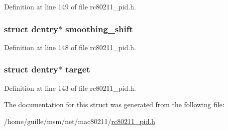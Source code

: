 Definition at line 149 of file rc80211\-\_\-pid.\-h.

\hypertarget{structrc__pid__debugfs__entries_aaca47ee03a834e073bbf46987f4a531b}{
\subsubsection[{smoothing\-\_\-shift}]{\setlength{\rightskip}{0pt plus 5cm}struct dentry$\ast$ smoothing\-\_\-shift}}\label{structrc__pid__debugfs__entries_aaca47ee03a834e073bbf46987f4a531b}


Definition at line 148 of file rc80211\-\_\-pid.\-h.

\hypertarget{structrc__pid__debugfs__entries_a6dabe07e2b398ac0f58ac8f38a4b56b6}{
\subsubsection[{target}]{\setlength{\rightskip}{0pt plus 5cm}struct dentry$\ast$ target}}\label{structrc__pid__debugfs__entries_a6dabe07e2b398ac0f58ac8f38a4b56b6}


Definition at line 143 of file rc80211\-\_\-pid.\-h.



The documentation for this struct was generated from the following file\-:\begin{DoxyCompactItemize}
\item 
/home/guille/msm/net/mac80211/\hyperlink{rc80211__pid_8h}{rc80211\-\_\-pid.\-h}\end{DoxyCompactItemize}
